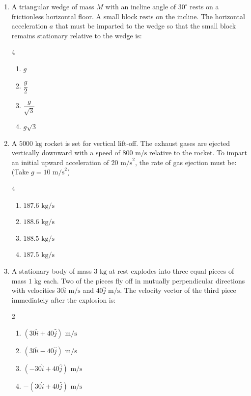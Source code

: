 \documentclass[11pt,a4paper]{article}
\begin{document}
\begin{enumerate}[label=\textbf{\arabic*.},leftmargin=18pt,itemsep=8pt,resume]
  \item A triangular wedge of mass $M$ with an incline angle of $30^\circ$ rests on a frictionless horizontal floor. A small block rests on the incline. The horizontal acceleration $a$ that must be imparted to the wedge so that the small block remains stationary relative to the wedge is:
  \begin{multicols}{4}
    \begin{enumerate}[label=(\Alph*)]
      \item $g$
      \item $\dfrac{g}{2}$
      \item $\dfrac{g}{\sqrt{3}}$
      \item $g\sqrt{3}$
    \end{enumerate}
  \end{multicols}

  \item A $5000\text{ kg}$ rocket is set for vertical lift-off. The exhaust gases are ejected vertically downward with a speed of $800\text{ m/s}$ relative to the rocket. To impart an initial upward acceleration of $20\text{ m/s}^2$, the rate of gas ejection must be: (Take $g = 10\text{ m/s}^2$)
  \begin{multicols}{4}
    \begin{enumerate}[label=(\Alph*)]
      \item $187.6\text{ kg/s}$
      \item $188.6\text{ kg/s}$
      \item $188.5\text{ kg/s}$
      \item $187.5\text{ kg/s}$
    \end{enumerate}
  \end{multicols}

  \item A stationary body of mass $3\text{ kg}$ at rest explodes into three equal pieces of mass $1\text{ kg}$ each. Two of the pieces fly off in mutually perpendicular directions with velocities $30\hat{i}\text{ m/s}$ and $40\hat{j}\text{ m/s}$. The velocity vector of the third piece immediately after the explosion is:
  \begin{multicols}{2}
    \begin{enumerate}[label=(\Alph*)]
      \item $(30\hat{i} + 40\hat{j})\text{ m/s}$
      \item $(30\hat{i} - 40\hat{j})\text{ m/s}$
      \item $(-30\hat{i} + 40\hat{j})\text{ m/s}$
      \item $-(30\hat{i} + 40\hat{j})\text{ m/s}$
    \end{enumerate}
  \end{multicols}


\end{enumerate}
\end{document}
